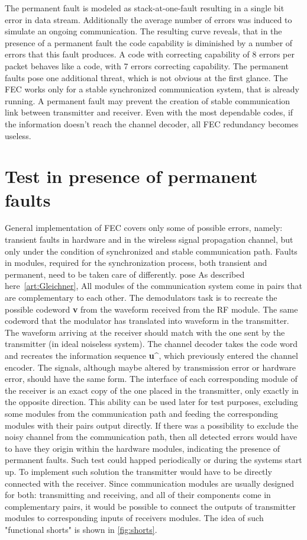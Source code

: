 The permanent fault is modeled as stack-at-one-fault resulting in a single bit error in data stream. Additionally the average number of errors was induced to simulate an ongoing communication. The resulting curve reveals, that in the presence of a permanent fault the code capability is diminished by a number of errors that this fault produces. A code with correcting capability of 8 errors per packet behaves like a code, with 7 errors correcting capability. The permanent faults pose one additional threat, which is not obvious at the first glance. The FEC works only for a stable synchronized communication system, that is already running. A permanent fault may prevent the creation of stable communication link between transmitter and receiver. Even with the most dependable codes, if the information doesn't reach the channel decoder, all FEC redundancy becomes useless.

\section{Test in presence of permanent faults}\label{sec:shorts}
General implementation of FEC covers only some of possible errors, namely: transient faults in hardware and in the wireless signal propagation channel, but only under the condition of synchronized and stable communication path. Faults in modules, required for the synchronization process, both transient and permanent, need to be taken care of differently. pose As described here~\autoref{art:Gleichner}, 
All modules of the communication system come in pairs that are complementary to each other. The demodulators task is to recreate the possible codeword \textbf{v} from the waveform received from the RF module. The same codeword that the modulator has translated into waveform in the transmitter. The waveform arriving at the receiver should match with the one sent by the transmitter (in ideal noiseless system). The channel decoder takes the code word and recreates the information sequence \textbf{u\^}, which previously entered the channel encoder. The signals, although maybe altered by transmission error or hardware error, should have the same form. The interface of each corresponding module of the receiver is an exact copy of the one placed in the transmitter, only exactly in the opposite direction. This ability can be used later for test purposes, excluding some modules from the communication path and feeding the corresponding modules with their pairs output directly.
If there was a possibility to exclude the noisy channel from the communication path, then all detected errors would have to have they origin within the hardware modules, indicating the presence of permanent faults. Such test could happed periodically or during the systems start up.
To implement such solution the transmitter would have to be directly connected with the receiver. Since communication modules are usually designed for both: transmitting and receiving, and all of their components come in complementary pairs, it would be possible to connect the outputs of transmitter modules to corresponding inputs of receivers modules. The idea of such "functional shorts" is shown in \autoref{fig:shorts}.
